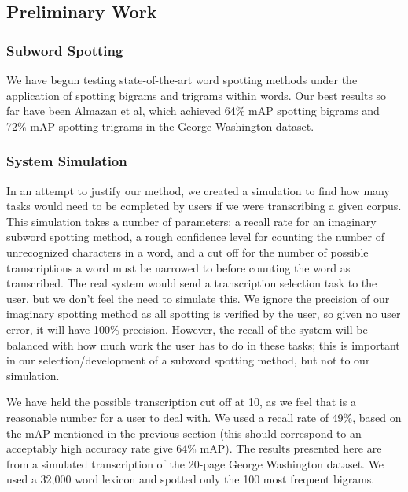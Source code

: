 \documentclass[ms]{byuprop}
\begin{document}

\subsection{Preliminary Work}

\subsubsection{Subword Spotting}
We have begun testing state-of-the-art word spotting methods under the application of spotting bigrams and trigrams within words. Our best results so far have been Almazan et al\cite{Almazan2014}, which achieved 64\% mAP spotting bigrams and 72\% mAP spotting trigrams in the George Washington dataset.

\subsubsection{System Simulation}
In an attempt to justify our method, we created a simulation to find how many tasks would need to be completed by users if we were transcribing a given corpus. This simulation takes a number of parameters: a recall rate for an imaginary subword spotting method, a rough confidence level for counting the number of unrecognized characters in a word, and a cut off for the number of possible transcriptions a word must be narrowed to before counting the word as transcribed. The real system would send a transcription selection task to the user, but we don't feel the need to simulate this. We ignore the precision of our imaginary spotting method as all spotting is verified by the user, so given no user error, it will have 100\% precision. However, the recall of the system will be balanced with how much work the user has to do in these tasks; this is important in our selection/development of a subword spotting method, but not to our simulation.

We have held the possible transcription cut off at 10, as we feel that is a reasonable number for a user to deal with. We used a recall rate of 49\%, based on the mAP mentioned in the previous section (this should correspond to an acceptably high accuracy rate give 64\% mAP). The results presented here are from a simulated transcription of the 20-page George Washington dataset. We used a 32,000 word lexicon and spotted only the 100 most frequent bigrams.
\end{document}
